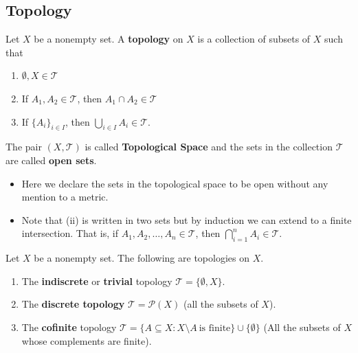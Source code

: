\subsection{Topology}

\begin{definition}[Topology]
   Let \( X  \) be a nonempty set. A \textbf{topology} on \( X  \) is a collection of subsets of \( X  \) such that  
   \begin{enumerate}
       \item[(i)] \( \emptyset, X  \in \mathcal{T} \)
        \item[(ii)] If \( {A}_{1}, {A}_{2} \in \mathcal{T} \), then \( {A}_{1} \cap {A}_{2} \in \mathcal{T} \)
        \item[(iii)] If \( \{ {A}_{i} \}_{i \in I} \), then \( \bigcup_{ i \in I  }^{  }  {A}_{i} \in \mathcal{T} \).
   \end{enumerate}
   The pair \( (X,\mathcal{T}) \) is called \textbf{Topological Space} and the sets in the collection \( \mathcal{T} \) are called \textbf{open sets}.
\end{definition}

\begin{remark}
  \begin{itemize}
      \item Here we declare the sets in the topological space to be open without any mention to a metric.
      \item Note that (ii) is written in two sets but by induction we can extend to a finite intersection. That is, if \( {A}_{1}, {A}_{2}, \dots, {A}_{n} \in \mathcal{T} \), then \( \bigcap_{ i =  1  }^{ n  }  {A}_{i} \in \mathcal{T} \).  
  \end{itemize}  

\end{remark}

\begin{eg}
    Let \( X  \) be a nonempty set. The following are topologies on \( X  \).
    \begin{enumerate}
        \item[(a)] The \textbf{indiscrete} or \textbf{trivial} topology \( \mathcal{T} = \{  \emptyset , X  \}  \).
        \item[(b)] The \textbf{discrete topology} \( \mathcal{T} = \mathcal{P}(X) \) (all the subsets of \( X  \)).
        \item[(c)] The \textbf{cofinite} topology \( \mathcal{T} = \{  A \subseteq X : X \setminus  A \ \text{is finite}  \} \cup \{ \emptyset \} \) (All the subsets of \( X  \) whose complements are finite).
    \end{enumerate}
\end{eg}


